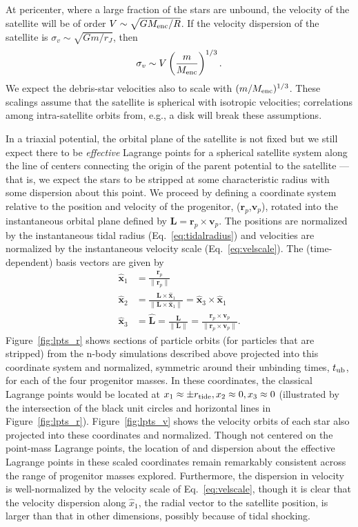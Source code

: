 \documentclass[letterpaper,12pt,preprint]{aastex}
\newcommand{\rtide}{r_{\rm tide}}
\newcommand{\bs}{\boldsymbol}
\newcommand{\tub}{t_{\rm ub}}
\begin{document}
At pericenter, where a large fraction of the stars are unbound, the velocity of the satellite will be of order $V\sim \sqrt{GM_{\rm enc}/R}$. If the velocity dispersion of the satellite is $\sigma_v \sim \sqrt{Gm/r_J}$, then
\begin{equation}
	\sigma_v \sim V\left(\frac{m}{M_{\rm enc}}\right)^{1/3}\label{eq:velscale}.
\end{equation}
We expect the debris-star velocities also to scale with $(m/M_{\rm enc})^{1/3}$. These scalings assume that the satellite is spherical with isotropic velocities; correlations among intra-satellite orbits from, e.g., a disk will break these assumptions. 

In a triaxial potential, the orbital plane of the satellite is not fixed but we still expect there to be \emph{effective} Lagrange points for a spherical satellite system along the line of centers connecting the origin of the parent potential to the satellite --- that is, we expect the stars to be stripped at some characteristic radius with some dispersion about this point. We proceed by defining a coordinate system relative to the position and velocity of the progenitor, ($\bs{r}_p$,$\bs{v}_p$), rotated into the instantaneous orbital plane defined by $\bs{L} = \bs{r}_p \times \bs{v}_p$. The positions are normalized by the instantaneous tidal radius (Eq.~\ref{eq:tidalradius}) and velocities are normalized by the instantaneous velocity scale (Eq.~\ref{eq:velscale}). 
The (time-dependent) basis vectors are given by
\begin{align}
	\hat{\bs{x}}_1 &= \frac{\bs{r}_p}{\|\bs{r}_p\|}\label{eq:x1}\\
	\hat{\bs{x}}_2 &= \frac{\bs{L} \times \hat{\bs{x}}_1}{\|\bs{L} \times \hat{\bs{x}}_1\|} = \hat{\bs{x}}_3 \times \hat{\bs{x}}_1\\
	\hat{\bs{x}}_3 &= \hat{\bs{L}} = \frac{\bs{L}}{\|\bs{L}\|} = \frac{\bs{r}_p \times \bs{v}_p}{\|\bs{r}_p \times \bs{v}_p\|}\label{eq:x3}.
\end{align}
Figure~\ref{fig:lpts_r} shows sections of particle orbits (for particles that are stripped) from the n-body simulations described above projected into this coordinate system and normalized, symmetric around their unbinding times, $\tub$, for each of the four progenitor masses. In these coordinates, the classical Lagrange points would be located at $x_1\approx\pm\rtide,x_2\approx0,x_3\approx0$ (illustrated by the intersection of the black unit circles and horizontal lines in Figure~\ref{fig:lpts_r}). Figure~\ref{fig:lpts_v} shows the velocity orbits of each star also projected into these coordinates and normalized. Though not centered on the point-mass Lagrange points, the location of and dispersion about the effective Lagrange points in these scaled coordinates remain remarkably consistent across the range of progenitor masses explored. Furthermore, the dispersion in velocity is well-normalized by the velocity scale of Eq.~\ref{eq:velscale}, though it is clear that the velocity dispersion along $\hat{x}_1$, the radial vector to the satellite position, is larger than that in other dimensions, possibly because of tidal shocking. 
\end{document}
